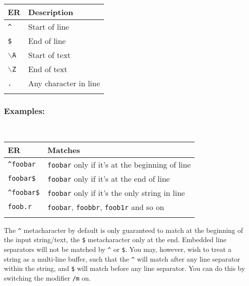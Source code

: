 \begin{footnotesize}
  \begin{tabularx}{\textwidth}{>{\hsize=0.3\hsize}X>{\hsize=0.7\hsize}X}\\
    \hline
    \textbf{ER} & \textbf{Description} \\
    \hline
    \texttt{\^{}} & Start of line \\
    \texttt{\$} & End of line \\
    \texttt{$\backslash$A} & Start of text \\
    \texttt{$\backslash$Z} & End of text \\
    \texttt{.} & Any character in line \\
    \hline
    \\
  \end{tabularx}
\end{footnotesize}


\subsubsection{Examples:}\\

\begin{footnotesize}
  \begin{tabularx}{\textwidth}{>{\hsize=0.3\hsize}X>{\hsize=0.7\hsize}X}\\
    \hline
    \textbf{ER} & \textbf{Matches} \\
    \hline
    \texttt{\^{}foobar} & \texttt{foobar} only if it's at the beginning of line \\
    \texttt{foobar\$} & \texttt{foobar} only if it's at the end of line \\
    \texttt{\^{}foobar\$} & \texttt{foobar} only if it's the only string in line \\
    \texttt{foob.r} & \texttt{foobar}, \texttt{foobbr}, \texttt{foob1r} and so on \\
    \hline
    \\
  \end{tabularx}
\end{footnotesize}

The \texttt{\^{}} metacharacter by default is only guaranteed to match at
the beginning of the input string/text, the \texttt{\$} metacharacter
only at the end. Embedded line separators will not be matched by
\texttt{\^{}} or \texttt{\$}. You may, however, wish to treat a string
as a multi-line buffer, such that the \texttt{\^{}} will match after
any line separator within the string, and \texttt{\$} will match before
any line separator. You can do this by switching the modifier \texttt{/m} on.

